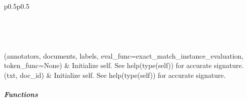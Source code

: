 \documentclass[letterpaper,10pt,english]{sphinxmanual}
\begin{document}
\begin{savenotes}\sphinxatlongtablestart\begin{longtable}[c]{p{0.5\linewidth}p{0.5\linewidth}}
\hline

\endfirsthead

%
{}\\
\hline

\endhead

\hline
{}\\
\endfoot

\endlastfoot

{\hyperref[\detokenize{autoapi/pine/backend/pineiaa/bratiaa/index:pine.backend.pineiaa.bratiaa.F1Agreement}]{}}(annotators, documents, labels, eval\_func=exact\_match\_instance\_evaluation, token\_func=None)
&
Initialize self.  See help(type(self)) for accurate signature.
\\
\hline
{\hyperref[\detokenize{autoapi/pine/backend/pineiaa/bratiaa/index:pine.backend.pineiaa.bratiaa.Document}]{}}(txt, doc\_id)
&
Initialize self.  See help(type(self)) for accurate signature.
\\
\hline
\end{longtable}\sphinxatlongtableend\end{savenotes}


\subparagraph{Functions}
\label{\detokenize{autoapi/pine/backend/pineiaa/bratiaa/index:functions}}
\end{document}

